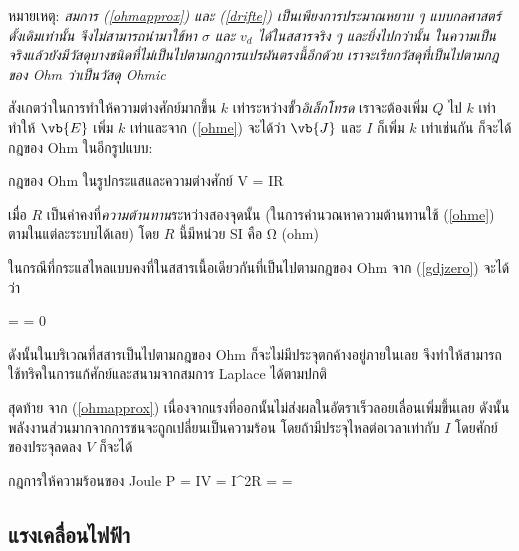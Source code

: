 หมายเหตุ: \emph{สมการ (\ref{ohmapprox}) และ (\ref{drifte}) เป็นเพียงการประมาณหยาบ ๆ แบบกลศาสตร์ดั้งเดิมเท่านั้น จึงไม่สามารถนำมาใช้หา $\sigma$ และ $v_d$ ได้ในสสารจริง ๆ และยิ่งไปกว่านั้น ในความเป็นจริงแล้วยังมีวัสดุบางชนิดที่ไม่เป็นไปตามกฎการแปรผันตรงนี้อีกด้วย เราจะเรียกวัสดุที่เป็นไปตามกฎของ Ohm ว่าเป็นวัสดุ Ohmic}

สังเกตว่าในการทำให้ความต่างศักย์มากขึ้น $k$ เท่าระหว่างขั้ว\emph{อิเล็กโทรด} เราจะต้องเพิ่ม $Q$ ไป $k$ เท่า ทำให้ $\vb{E}$ เพิ่ม $k$ เท่าและจาก (\ref{ohme}) จะได้ว่า $\vb{J}$ และ $I$ ก็เพิ่ม $k$ เท่าเช่นกัน ก็จะได้กฎของ Ohm ในอีกรูปแบบ:
\begin{ieqbox}{กฎของ Ohm ในรูปกระแสและความต่างศักย์} 
    V = IR \label{ohmv}
\end{ieqbox}
เมื่อ $R$ เป็นค่าคงที่\emph{ความต้านทาน}ระหว่างสองจุดนั้น (ในการคำนวณหาความต้านทานใช้ (\ref{ohme}) ตามในแต่ละระบบได้เลย) โดย $R$ นี้มีหน่วย SI คือ $\unit{\ohm}$ (ohm)

ในกรณีที่กระแสไหลแบบคงที่ในสสารเนื้อเดียวกันที่เป็นไปตามกฎของ Ohm จาก (\ref{gdjzero}) จะได้ว่า
\begin{eqnobox} 
    \gd\cdot{} = \gd\cdot{} = 0 
\end{eqnobox}
ดังนั้นในบริเวณที่สสารเป็นไปตามกฎของ Ohm ก็จะไม่มีประจุตกค้างอยู่ภายในเลย จึงทำให้สามารถใช้ทริคในการแก้ศักย์และสนามจากสมการ Laplace ได้ตามปกติ

สุดท้าย จาก (\ref{ohmapprox}) เนื่องจากแรงที่ออกนั้นไม่ส่งผลในอัตราเร็วลอยเลื่อนเพิ่มขึ้นเลย ดังนั้นพลังงานส่วนมากจากการชนจะถูกเปลี่ยนเป็นความร้อน โดยถ้ามีประจุไหลต่อเวลาเท่ากับ $I$ โดยศักย์ของประจุลดลง $V$ ก็จะได้
\begin{ieqbox}{กฎการให้ความร้อนของ Joule} 
    P = IV = I^2R =  =  \label{jouleheat}
\end{ieqbox}

\subsection{แรงเคลื่อนไฟฟ้า}

